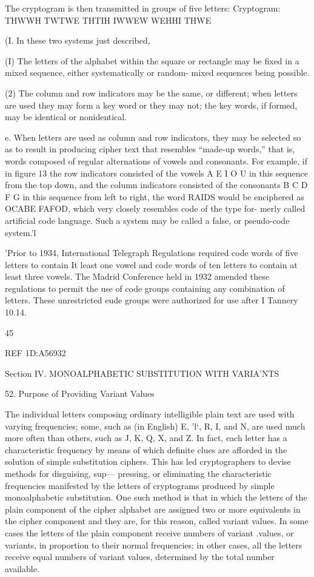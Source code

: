 {{The cryptogram is then transmitted in groups of ﬁve letters:
Cryptogram: THWWH TWTWE THTIH IWWEW WEHHI THWE

(I. In these two systems just described,

(I) The letters of the alphabet within the square or rectangle may
be ﬁxed in a mixed sequence, either systematically or random-
mixed sequences being possible.

(2) The column and row indicators may be the same, or different;
when letters are used they may form a key word or they may
not; the key words, if formed, may be identical or nonidentical.

e. When letters are used as column and row indicators, they may be
selected so as to result in producing cipher text that resembles “made-up
words,” that is, words composed of regular alternations of vowels and
consonants. For example, if in ﬁgure 13 the row indicators consisted of
the vowels A E I O U in this sequence from the top down, and the
column indicators consisted of the consonants B C D F G in this
sequence from left to right, the word RAIDS would be enciphered as
OCABE FAFOD, which very closely resembles code of the type for-
merly called artiﬁcial code language. Such a system may be called a
false, or pseudo-code system.’l

'Prior to 1934, International Telegraph Regulations required code words of ﬁve letters to
contain It least one vowel and code words of ten letters to contain at least three vowels. The
Madrid Conference held in 1932 amended these regulations to permit the use of code groups
containing any combination of letters. These unrestricted eude groups were authorized for use
after I Tannery 10.14.

45

 

 

REF 1D:A56932

Section IV. MONOALPHABETIC SUBSTITUTION
WITH VARIA'NTS

52. Purpose of Providing Variant Values

The individual letters composing ordinary intelligible plain text are
used with varying frequencies; some, such as (in English) E, 'l‘, R, I,
and N, are used much more often than others, such as J, K, Q, X, and Z.
In fact, each letter has a characteristic frequency by means of which
deﬁnite clues are afforded in the solution of simple substitution ciphers.
This has led cryptographers to devise methods for disguising, sup—
pressing, or eliminating the characteristic frequencies manifested by the
letters of cryptograms produced by simple monoalphabetic substitution.
One such method is that in which the letters of the plain component of
the cipher alphabet are assigned two or more equivalents in the cipher
component and they are, for this reason, called variant values. In some
cases the letters of the plain component receive numbers of variant
.values, or variants, in proportion to their normal frequencies; in other
cases, all the letters receive equal numbers of variant values, determined
by the total number available.

}}
